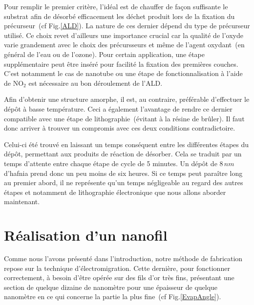 Pour remplir le premier critère, l'idéal est de chauffer de façon suffisante le substrat afin de désorbé efficacement les déchet produit lors de la fixation du précurseur~(cf Fig.\ref{ALD}). La nature de ces dernier dépend du type de précurseur utilisé. Ce choix revet d'ailleurs une importance crucial car la qualité de l'oxyde varie grandement avec le choix des précursseurs et même de l'agent oxydant~(en général de l'eau ou de l'ozone). Pour certain application, une étape supplémentaire peut être inséré pour facilité la fixation des premières couches. C'est notamment le cas de nanotube ou une étape de fonctionnalisation à l'aide de NO$_2$ est nécessaire au bon déroulement de l'ALD.

Afin d'obtenir une structure amorphe, il est, au contraire, préférable d'effectuer le dép\^ot à basse température. Ceci a également l'avantage de rendre ce dernier compatible avec une étape de lithographie~(évitant à la résine de brûler). Il faut donc arriver à trouver un compromis avec ces deux conditions contradictoire.

Celui-ci été trouvé en laissant un temps conséquent entre les différentes étapes du dépôt, permettant aux produits de réaction de désorber. Cela se traduit par un temps d'attente entre chaque étape de cycle de 5 minutes. Un dépôt de $8\,nm$ d'hafnia prend donc un peu moins de six heures. Si ce temps peut paraître long au premier abord, il ne représente qu'un temps négligeable au regard des autres étapes et notamment de lithographie électronique que nous allons aborder maintenant.

\section{Réalisation d'un nanofil}
Comme nous l'avons présenté dans l'introduction, notre méthode de fabrication repose sur la technique d'électromigration. Cette dernière, pour fonctionner correctement, à besoin d'\^etre opérée sur des fils d'or très fins, présentant une section de quelque dizaine de nanomètre pour une épaisseur de quelque nanomètre en ce qui concerne la partie la plus fine~(cf Fig.\ref{EvapAngle}). 

